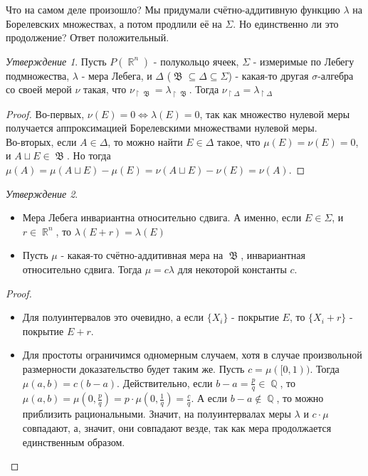 \documentclass[a4paper]{article}
\theoremstyle{indented}
\theoremstyle{definition}
\theoremstyle{remark}
\newtheorem{stat}{Утверждение}
\DeclareMathOperator{\QQ}{\mathbb{Q}}
\DeclareMathOperator{\RR}{\mathbb{R}}
\DeclareMathOperator{\GB}{\mathfrak{B}}
\begin{document}
Что на самом деле произошло? Мы придумали счётно-аддитивную функцию $\lambda$ на Борелевских множествах, а потом продлили её на $\Sigma$. Но единственно ли это продолжение? Ответ положительный.
\begin{stat}
Пусть $P(\RR^n)$ - полукольцо ячеек, $\Sigma$ - измеримые по Лебегу подмножества, $\lambda$ - мера Лебега, и $\Delta$ ($\GB \subseteq \Delta \subseteq \Sigma$) - какая-то другая $\sigma$-алгебра со своей мерой $\nu$ такая, что $\nu_{\upharpoonright \GB} = \lambda_{\upharpoonright \GB}$. Тогда $\nu_{\upharpoonright \Delta} = \lambda_{\upharpoonright \Delta}$
\end{stat}
\begin{proof}
Во-первых, $\nu(E)=0 \iff \lambda(E)=0$, так как множество нулевой меры получается аппроксимацией Борелевскими множествами нулевой меры.
\\
Во-вторых, если $A \in \Delta$, то можно найти $E \in \Delta$ такое, что $\mu(E)=\nu(E)=0$, и $A \sqcup E \in \GB $. Но тогда $\mu(A)=\mu(A \sqcup E) -\mu(E)= \nu(A \sqcup E) - \nu(E) = \nu(A)$.
\end{proof}
\begin{stat}
\
\begin{itemize}
    \item Мера Лебега инвариантна относительно сдвига. А именно, если $E \in \Sigma$, и $r \in \RR^n$, то $\lambda(E+r)=\lambda(E)$
    \item Пусть $\mu$ - какая-то счётно-аддитивная мера на $\GB$, инвариантная относительно сдвига. Тогда $\mu=c \lambda$ для некоторой константы $c$.
\end{itemize}
\end{stat}
\begin{proof}
\begin{itemize}
\
    \item Для полуинтервалов это очевидно, а если $\{X_i\}$ - покрытие $E$, то $\{X_i+r\}$ - покрытие $E+r$.
    \item Для простоты ограничимся одномерным случаем, хотя в случае произвольной размерности доказательство будет таким же. 
Пусть $c=\mu([0, 1))$. Тогда $\mu(a, b) = c(b-a)$. Действительно, если $b-a = \frac{p}{q} \in \QQ$, то $\mu(a, b) = \mu(0, \frac{p}{q}) = p \cdot \mu(0, \frac{1}{q})=\frac{c}{q}$. А если $b-a \notin \QQ$, то можно приблизить рациональными. Значит, на полуинтервалах меры $\lambda$ и $c \cdot \mu$ совпадают, а, значит, они совпадают везде, так как мера продолжается единственным образом.
\end{itemize}
\end{proof}
\end{document}
